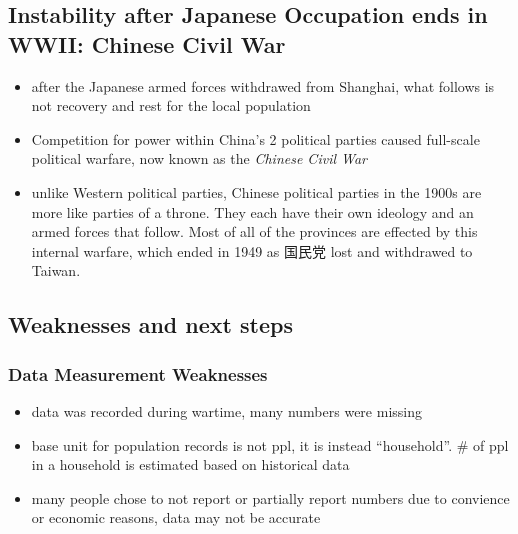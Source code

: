 \documentclass[
  letterpaper,
  DIV=11,
  numbers=noendperiod]{scrartcl}
\providecommand{\tightlist}{%
  \setlength{\itemsep}{0pt}\setlength{\parskip}{0pt}}\usepackage{longtable,booktabs,array}
\begin{document}
\hypertarget{instability-after-japanese-occupation-ends-in-wwii-chinese-civil-war}{%
\subsection{Instability after Japanese Occupation ends in WWII: Chinese
Civil
War}\label{instability-after-japanese-occupation-ends-in-wwii-chinese-civil-war}}

\begin{itemize}
\tightlist
\item
  after the Japanese armed forces withdrawed from Shanghai, what follows
  is not recovery and rest for the local population
\item
  Competition for power within China's 2 political parties caused
  full-scale political warfare, now known as the \emph{Chinese Civil
  War}
\item
  unlike Western political parties, Chinese political parties in the
  1900s are more like parties of a throne. They each have their own
  ideology and an armed forces that follow. Most of all of the provinces
  are effected by this internal warfare, which ended in 1949 as 国民党
  lost and withdrawed to Taiwan.
\end{itemize}

\hypertarget{weaknesses-and-next-steps}{%
\subsection{Weaknesses and next steps}\label{weaknesses-and-next-steps}}

\hypertarget{data-measurement-weaknesses}{%
\subsubsection{Data Measurement
Weaknesses}\label{data-measurement-weaknesses}}

\begin{itemize}
\tightlist
\item
  data was recorded during wartime, many numbers were missing
\item
  base unit for population records is not ppl, it is instead
  ``household''. \# of ppl in a household is estimated based on
  historical data
\item
  many people chose to not report or partially report numbers due to
  convience or economic reasons, data may not be accurate
\end{itemize}
\end{document}
